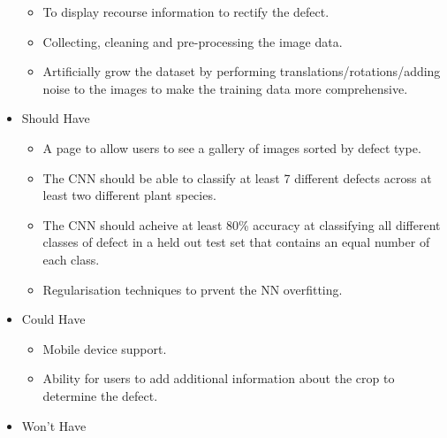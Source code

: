 \begin{itemize}
\begin{itemize}
      	\item To display recourse information to rectify the defect.\checkmark
      	\item Collecting, cleaning and pre-processing the image data. \checkmark
        \item Artificially grow the dataset by performing translations/rotations/adding noise to the images to make the training data more comprehensive.\checkmark
      \end{itemize}
      \item Should Have
      \begin{itemize}
        \item A page to allow users to see a gallery of images sorted by
          defect type. \checkmark
        \item The CNN should be able to classify at least 7 different defects across at least two different plant species. \checkmark
        \item The CNN should acheive at least 80\% accuracy at classifying all different classes of defect in a held out test set that contains an equal number of each class. \checkmark
      	\item Regularisation techniques to prvent the NN overfitting. \checkmark
      \end{itemize}
      \item Could Have
        \begin{itemize}
          \item Mobile device support. \checkmark
        \end{itemize}
      \begin{itemize}
        \item Ability for users to add additional information about the crop
          to determine the defect.
      \end{itemize}
      \item Won't Have
    \end{itemize}
